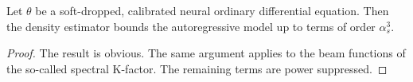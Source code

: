 \begin{lemma}[Interpretability]\label{thm:2}
Let $\theta$ be a soft-dropped, calibrated neural ordinary differential
equation. Then the density estimator bounds the autoregressive model up
to terms of order $\alpha_s^3$.
\end{lemma}

\begin{proof}
The result is obvious. The same argument applies to the beam functions
of the so-called spectral K-factor. The remaining terms are power
suppressed.
\end{proof}

